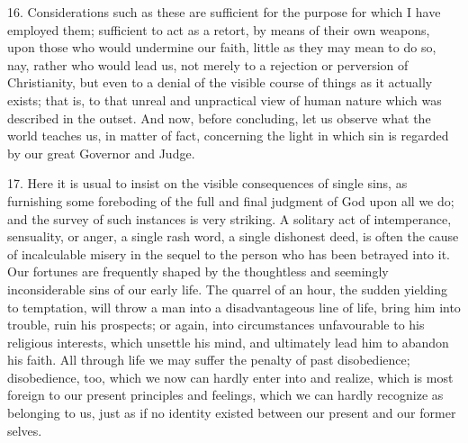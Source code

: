 16. Considerations such as these are sufficient for the purpose for
which I have employed them; sufficient to act as a retort, by means of
their own weapons, upon those who would undermine our faith, little as
they may mean to do so, nay, rather who would lead us, not merely to a
rejection or perversion of Christianity, but even to a denial of the
visible course of things as it actually exists; that is, to that
unreal and unpractical view of human nature which was described in the
outset. And now, before concluding, let us observe what the world
teaches us, in matter of fact, concerning the light in which sin is
regarded by our great Governor and Judge.

17. Here it is usual to insist on the visible consequences of
single sins, as furnishing some foreboding of the full and final
judgment of God upon all we do; and the survey of such instances is
very striking. A solitary act of intemperance, sensuality, or anger, a
single rash word, a single dishonest deed, is often the cause of
incalculable misery in the sequel to the person who has been betrayed
into it. Our fortunes are frequently shaped by the thoughtless and
seemingly inconsiderable sins of our early life. The quarrel of an
hour, the sudden yielding to temptation, will throw a man into a
disadvantageous line of life, bring him into trouble, ruin his
prospects; or again, into circumstances unfavourable to his religious
interests, which unsettle his mind, and ultimately lead him to abandon
his faith. All through life we may suffer the penalty of past
disobedience; disobedience, too, which we now can hardly enter into
and realize, which is most foreign to our present principles and
feelings, which we can hardly recognize as belonging to us, just as if
no identity existed between our present and our former selves.


